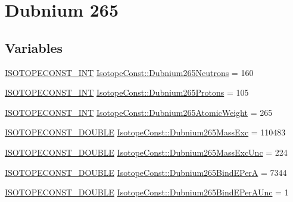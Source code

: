 \hypertarget{group___isotope_const-_dubnium-_db265}{}\section{Dubnium 265}
\label{group___isotope_const-_dubnium-_db265}
\subsection*{Variables}
\begin{DoxyCompactItemize}
\item 
\mbox{\hyperlink{group___isotope_const-_macros_ga5f18360b3e99483a35c32d789e62621c}{I\+S\+O\+T\+O\+P\+E\+C\+O\+N\+S\+T\+\_\+\+I\+NT}} \mbox{\hyperlink{group___isotope_const-_dubnium-_db265_gab8cb20af5e63617afa46b0c773255ffc}{Isotope\+Const\+::\+Dubnium265\+Neutrons}} = 160
\item 
\mbox{\hyperlink{group___isotope_const-_macros_ga5f18360b3e99483a35c32d789e62621c}{I\+S\+O\+T\+O\+P\+E\+C\+O\+N\+S\+T\+\_\+\+I\+NT}} \mbox{\hyperlink{group___isotope_const-_dubnium-_db265_gadf40bb6e0a9795f0509262274b545f7d}{Isotope\+Const\+::\+Dubnium265\+Protons}} = 105
\item 
\mbox{\hyperlink{group___isotope_const-_macros_ga5f18360b3e99483a35c32d789e62621c}{I\+S\+O\+T\+O\+P\+E\+C\+O\+N\+S\+T\+\_\+\+I\+NT}} \mbox{\hyperlink{group___isotope_const-_dubnium-_db265_gaa4de48e134df8471b54263280b15cced}{Isotope\+Const\+::\+Dubnium265\+Atomic\+Weight}} = 265
\item 
\mbox{\hyperlink{group___isotope_const-_macros_ga8f45a7272ce02c0b4c65c44636ed719a}{I\+S\+O\+T\+O\+P\+E\+C\+O\+N\+S\+T\+\_\+\+D\+O\+U\+B\+LE}} \mbox{\hyperlink{group___isotope_const-_dubnium-_db265_gae2272899951f09e60c396f8f53de71a2}{Isotope\+Const\+::\+Dubnium265\+Mass\+Exc}} = 110483
\item 
\mbox{\hyperlink{group___isotope_const-_macros_ga8f45a7272ce02c0b4c65c44636ed719a}{I\+S\+O\+T\+O\+P\+E\+C\+O\+N\+S\+T\+\_\+\+D\+O\+U\+B\+LE}} \mbox{\hyperlink{group___isotope_const-_dubnium-_db265_gaf04cd96d77821c8dd73e5bfbe9ad55db}{Isotope\+Const\+::\+Dubnium265\+Mass\+Exc\+Unc}} = 224
\item 
\mbox{\hyperlink{group___isotope_const-_macros_ga8f45a7272ce02c0b4c65c44636ed719a}{I\+S\+O\+T\+O\+P\+E\+C\+O\+N\+S\+T\+\_\+\+D\+O\+U\+B\+LE}} \mbox{\hyperlink{group___isotope_const-_dubnium-_db265_gac030febef1bf962a83b286e206a4cbc1}{Isotope\+Const\+::\+Dubnium265\+Bind\+E\+PerA}} = 7344
\item 
\mbox{\hyperlink{group___isotope_const-_macros_ga8f45a7272ce02c0b4c65c44636ed719a}{I\+S\+O\+T\+O\+P\+E\+C\+O\+N\+S\+T\+\_\+\+D\+O\+U\+B\+LE}} \mbox{\hyperlink{group___isotope_const-_dubnium-_db265_gab8e4e1cea740634710be0c23e35cf5bd}{Isotope\+Const\+::\+Dubnium265\+Bind\+E\+Per\+A\+Unc}} = 1

\end{DoxyCompactItemize}
